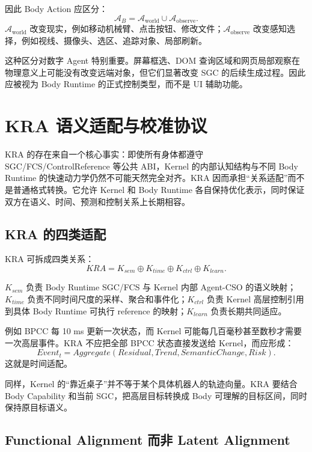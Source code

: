 因此 Body Action 应区分：
\[
\mathcal A_B
=
\mathcal A_{\mathrm{world}}
\cup
\mathcal A_{\mathrm{observe}}.
\]
$\mathcal A_{\mathrm{world}}$ 改变现实，例如移动机械臂、点击按钮、修改文件；$\mathcal A_{\mathrm{observe}}$ 改变感知选择，例如视线、摄像头、选区、追踪对象、局部刷新。

这种区分对数字 Agent 特别重要。屏幕框选、DOM 查询区域和网页局部观察在物理意义上可能没有改变远端对象，但它们显著改变 SGC 的后续生成过程。因此应被视为 Body Runtime 的正式控制类型，而不是 UI 辅助功能。


\chapter{KRA 语义适配与校准协议}
\label{app:kra}

\begin{chapterlead}
KRA 的存在来自一个核心事实：即使所有身体都遵守 SGC/FCS/ControlReference 等公共 ABI，Kernel 的内部认知结构与不同 Body Runtime 的快速动力学仍然不可能天然完全对齐。KRA 因而承担“关系适配”而不是普通格式转换。它允许 Kernel 和 Body Runtime 各自保持优化表示，同时保证双方在语义、时间、预测和控制关系上长期相容。
\end{chapterlead}

\section{KRA 的四类适配}

KRA 可拆成四类关系：
\[
KRA=
K_{sem}
\oplus
K_{time}
\oplus
K_{ctrl}
\oplus
K_{learn}.
\]

$K_{sem}$ 负责 Body Runtime SGC/FCS 与 Kernel 内部 Agent-CSO 的语义映射；$K_{time}$ 负责不同时间尺度的采样、聚合和事件化；$K_{ctrl}$ 负责 Kernel 高层控制引用到具体 Body Runtime 可执行 reference 的映射；$K_{learn}$ 负责长期共同适应。

例如 BPCC 每 10 ms 更新一次状态，而 Kernel 可能每几百毫秒甚至数秒才需要一次高层事件。KRA 不应把全部 BPCC 状态直接发送给 Kernel，而应形成：
\[
Event_t
=
Aggregate(
Residual,
Trend,
SemanticChange,
Risk
).
\]
这就是时间适配。

同样，Kernel 的“靠近桌子”并不等于某个具体机器人的轨迹向量。KRA 要结合 Body Capability 和当前 SGC，把高层目标转换成 Body 可理解的目标区间，同时保持原目标语义。

\section{Functional Alignment 而非 Latent Alignment}

